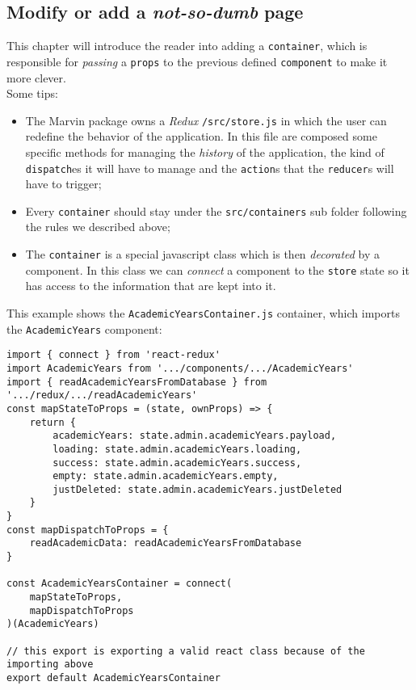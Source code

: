 \subsection{Modify or add a \emph{not-so-dumb} page}
This chapter will introduce the reader into adding a \verb|container|, which is responsible for \emph{passing} a \verb|props| to the previous defined \verb|component| to make it more clever.
\\Some tips:
\begin{itemize}
	\item The Marvin package owns a \emph{Redux} \verb|/src/store.js| in which the user can redefine the behavior of the application. In this file are composed some specific methods for managing the \emph{history} of the application, the kind of \verb|dispatch|es it will have to manage and the \verb|action|s that the \verb|reducer|s will have to trigger;
	\item Every \verb|container| should stay under the \verb|src/containers| sub folder following the rules we described above;
	\item The \verb|container| is a special javascript class which is then \emph{decorated} by a component. In this class we can \emph{connect} a component to the \verb|store| state so it has access to the information that are kept into it.
\end{itemize} 
This example shows the \verb|AcademicYearsContainer.js| container, which imports the \verb|AcademicYears| component:
\begin{lstlisting}
import { connect } from 'react-redux'
import AcademicYears from '.../components/.../AcademicYears'
import { readAcademicYearsFromDatabase } from '.../redux/.../readAcademicYears'
const mapStateToProps = (state, ownProps) => {
	return {
		academicYears: state.admin.academicYears.payload,
		loading: state.admin.academicYears.loading,
		success: state.admin.academicYears.success,
		empty: state.admin.academicYears.empty,
		justDeleted: state.admin.academicYears.justDeleted
	}
}
const mapDispatchToProps = {
	readAcademicData: readAcademicYearsFromDatabase
}

const AcademicYearsContainer = connect(
	mapStateToProps,
	mapDispatchToProps
)(AcademicYears)

// this export is exporting a valid react class because of the importing above
export default AcademicYearsContainer
\end{lstlisting}

